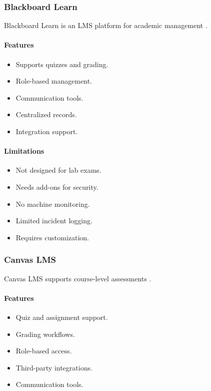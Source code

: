 \subsubsection{Blackboard Learn}
Blackboard Learn is an LMS platform for academic management \cite{blackboard1}.

\paragraph{Features}
\begin{itemize}[noitemsep]
\item Supports quizzes and grading.
\item Role-based management.
\item Communication tools.
\item Centralized records.
\item Integration support.
\end{itemize}

\paragraph{Limitations}
\begin{itemize}[noitemsep]
\item Not designed for lab exams.
\item Needs add-ons for security.
\item No machine monitoring.
\item Limited incident logging.
\item Requires customization.
\end{itemize}

\subsubsection{Canvas LMS}
Canvas LMS supports course-level assessments \cite{canvas1}.

\paragraph{Features}
\begin{itemize}[noitemsep]
\item Quiz and assignment support.
\item Grading workflows.
\item Role-based access.
\item Third-party integrations.
\item Communication tools.
\end{itemize}

